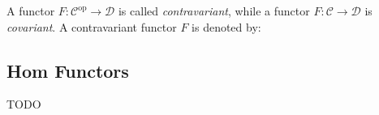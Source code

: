 A functor $F : \mathcal{C}^{\operatorname{op}} \to \mathcal{D}$ is called \textit{contravariant}, while
a functor $F : \mathcal{C} \to \mathcal{D}$ is \textit{covariant}. A contravariant functor $F$ is denoted by:

\subsection{Hom Functors}
TODO
